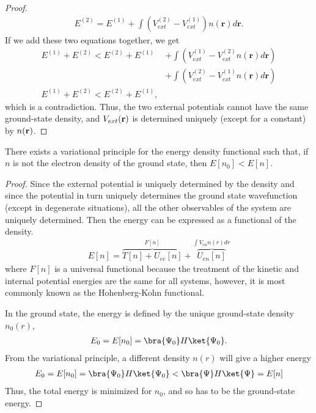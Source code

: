 \begin{proof}
\begin{align}
  E^{(2)} = E^{(1)} + \int \left(V_{ext}^{(2)} - V_{ext}^{(1)}\right) n(\textbf{r})d\textbf{r}.
\end{align}
If we add these two equations together, we get
\begin{align}
  E^{(1)} + E^{(2)} < E^{(2)} + E^{(1)} &+ \int \left( V_{ext}^{(1)} - V_{ext}^{(2)}n(\textbf{r})d\textbf{r} \right) \nonumber \\  &+ \int \left( V_{ext}^{(2)} - V_{ext}^{(1)}n(\textbf{r})d\textbf{r} \right) \nonumber \\
  E^{(1)} + E^{(2)} < E^{(2)} + E^{(1)},
\end{align}
which is a contradiction. Thus, the two external potentials cannot have the same ground-state density, and $V_{ext}(\textbf{\textbf{r}})$ is determined uniquely (except for a constant) by $n(\textbf{\textbf{r}})$.
\end{proof}

\begin{theorem}
  There exists a variational principle for the energy density functional such that, if $n$ is not the electron density of the ground state, then $E\left[ n_0 \right] < E\left[ n \right]$.
\end{theorem}
\begin{proof}
  Since the external potential is uniquely determined by the density and since the potential in turn uniquely determines the ground state wavefunction (except in degenerate situations), all the other observables of the system are uniquely determined. Then the energy can be expressed as a functional of the density.
  \begin{align}
    E[n] = \overbrace{T[n] + U_{ee}[n]}^{F[n]} + \overbrace{U_{en}[n]}^{\int V_{en}n(r)dr}
    \label{eq:densityfunctional}
  \end{align}
  where $F[n]$ is a universal functional because the treatment of the kinetic and internal potential energies are the same for all systems, however, it is most commonly known as the Hohenberg-Kohn functional.

  In the ground state, the energy is defined by the unique ground-state density $n_0(r)$,
  \begin{align}
    E_0 = E[n_0] = \bra{\Psi_0}H\ket{\Psi_0}.
  \end{align}
  From the variational principle, a different density $n(r)$ will give a higher energy
  \begin{align}
    E_0 = E[n_0] = \bra{\Psi_0}H\ket{\Psi_0} < \bra{\Psi}H\ket{\Psi} = E[n]
  \end{align}
  Thus, the total energy is minimized for $n_0$, and so has to be the ground-state energy.
\end{proof}


